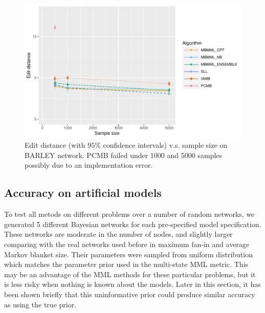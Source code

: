 \begin{figure}[H]
  \centering
    \includegraphics[scale=0.6]{figures/ed_vs_samplesize_barley.pdf}
  \caption{Edit distance (with $95\%$ confidence intervals) v.s. sample size on BARLEY network. PCMB failed under 1000 and 5000 samples possibly due to an implementation error.}
  \label{fg:barley}
\end{figure}

\subsection{Accuracy on artificial models} 
\label{sec:exp_artificial}
To test all metods on different problems over a number of random networks, we generated 5 different Bayesian networks for each pre-specified model specification. These networks are moderate in the number of nodes, and slightly larger comparing with the real networks used before in maximum fan-in and average Markov blanket size. Their parameters were sampled from uniform distribution which matches the parameter prior used in the multi-state MML metric. This may be an advantage of the MML methods for these particular problems, but it is less risky when nothing is known about the models. Later in this section, it has been shown briefly that this uninformative prior could produce similar accuracy as using the true prior.  

